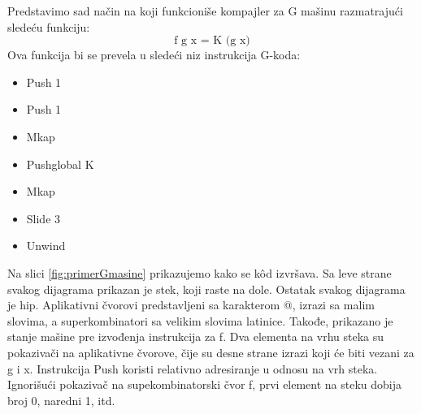 \begin{primer}
Predstavimo sad način na koji funkcioniše kompajler za G mašinu razmatrajući sledeću funkciju:
$$\text{f g x = K (g x)}$$
Ova funkcija bi se prevela u sledeći niz instrukcija G-koda:
\begin{itemize}
\item Push 1
\item Push 1
\item Mkap
\item Pushglobal K
\item Mkap
\item Slide 3
\item Unwind
\end{itemize}
\end{primer}
Na slici \ref{fig:primerGmasine} prikazujemo kako se k\^ od izvršava. Sa leve strane svakog dijagrama prikazan je stek, koji raste na dole. Ostatak svakog dijagrama je hip. Aplikativni čvorovi predstavljeni sa karakterom @, izrazi sa malim slovima, a superkombinatori sa velikim slovima latinice. Takođe, prikazano je stanje mašine pre izvođenja instrukcija za f. Dva elementa na vrhu steka su pokazivači na aplikativne čvorove, čije su desne strane izrazi koji će biti vezani za g i x. Instrukcija Push koristi relativno adresiranje u odnosu na vrh steka. Ignorišući pokazivač na supekombinatorski čvor f, prvi element na steku dobija broj 0, naredni 1, itd.

